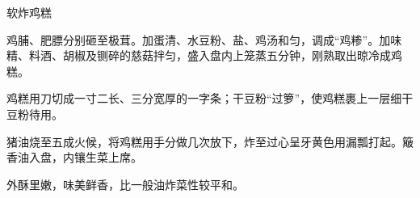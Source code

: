 \begin{recipe}{软炸鸡糕}

\ingredients


\preparation

\step 鸡脯、肥膘分别砸至极茸。加蛋清、水豆粉、盐、鸡汤和匀，调成“鸡糁”。加味
精、料酒、胡椒及铡碎的慈菇拌匀，盛入盘内上笼蒸五分钟，刚熟取出晾冷成鸡糕。

\step 鸡糕用刀切成一寸二长、三分宽厚的一字条；干豆粉“过箩”，使鸡糕裹上一层细干
豆粉待用。

\step 猪油烧至五成火候，将鸡糕用手分做几次放下，炸至过心呈牙黄色用漏瓢打起。簸
香油入盘，内镶生菜上席。

\features

外酥里嫩，味美鲜香，比一般油炸菜性较平和。

\end{recipe}

